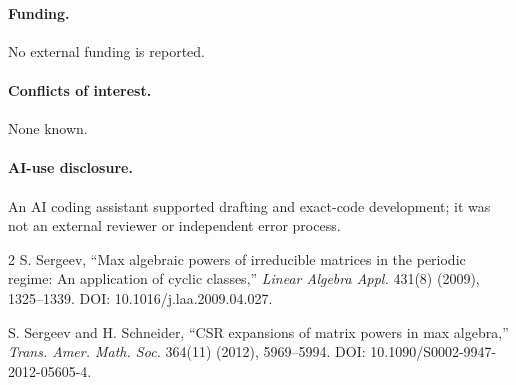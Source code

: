 \documentclass[9pt]{extarticle}
\begin{document}
\paragraph{Funding.} No external funding is reported.
\paragraph{Conflicts of interest.} None known.
\paragraph{AI-use disclosure.} An AI coding assistant supported drafting and
exact-code development; it was not an external reviewer or independent error
process.

\begin{thebibliography}{2}
 S. Sergeev,
``Max algebraic powers of irreducible matrices in the periodic regime: An
application of cyclic classes,'' \emph{Linear Algebra Appl.} 431(8) (2009),
1325--1339. DOI: 10.1016/j.laa.2009.04.027.

 S. Sergeev and H. Schneider,
``CSR expansions of matrix powers in max algebra,''
\emph{Trans. Amer. Math. Soc.} 364(11) (2012), 5969--5994.
DOI: 10.1090/S0002-9947-2012-05605-4.
\end{thebibliography}
\end{document}
